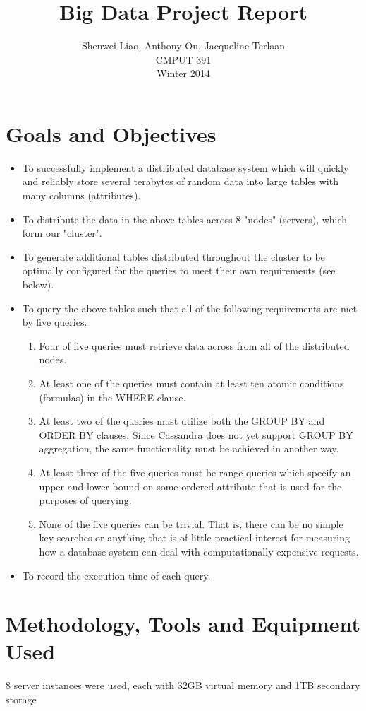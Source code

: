 \documentclass[letterpaper]{article}
\title{Big Data Project Report}
\author{Shenwei Liao, Anthony Ou, Jacqueline Terlaan\\
	CMPUT 391\\
Winter 2014}
\begin{document}
\maketitle
\section{Goals and Objectives}
\begin{itemize}
	\item To successfully implement a distributed database system which
		will quickly and reliably store several terabytes of random
		data into large tables with many columns (attributes).
	\item To distribute the data in the above tables across 8 "nodes"
		(servers), which form our "cluster".
	\item To generate additional tables distributed throughout the cluster
		to be optimally configured for the queries to meet their own
		requirements (see below).

	\item To query the above tables such that all of the following requirements
		are met by five queries.
		\begin{enumerate}
			\item Four of five queries must retrieve data across from all of the distributed nodes.
			\item At least one of the queries must contain at least ten atomic
				conditions (formulas) in the WHERE clause.
			\item At least two of the queries must utilize both the GROUP BY and
				ORDER BY clauses. Since Cassandra does not yet support GROUP BY
				aggregation, the same functionality must be achieved in another
				way.
			\item At least three of the five queries must be range queries which
				specify an upper and lower bound on some ordered attribute that
				is used for the purposes of querying.
			\item None of the five queries can be trivial. That is, there can be
				no simple key searches or anything that is of little practical
				interest for measuring how a database system can deal with
				computationally expensive requests.
		\end{enumerate}

	\item To record the execution time of each query.
\end{itemize}

\section{Methodology, Tools and Equipment Used}
8 server instances were used, each with 32GB virtual memory and 1TB secondary storage 
\end{document}
